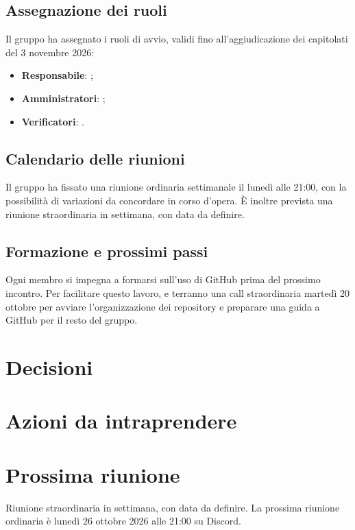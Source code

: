 \documentclass[verbale=interno]{gpt}
\begin{document}
\subsection{Assegnazione dei ruoli}
Il gruppo ha assegnato i ruoli di avvio, validi fino all'aggiudicazione
dei capitolati del 3 novembre 2026:
\begin{itemize}
  \item \textbf{Responsabile}: ;
  \item \textbf{Amministratori}: ;
  \item \textbf{Verificatori}: .
\end{itemize}

\subsection{Calendario delle riunioni}
Il gruppo ha fissato una riunione ordinaria settimanale il lunedì alle
21:00, con la possibilità di variazioni da concordare in corso d'opera.
È inoltre prevista una riunione straordinaria in settimana, con data da
definire.

\subsection{Formazione e prossimi passi}
Ogni membro si impegna a formarsi sull'uso di GitHub prima del prossimo
incontro. Per facilitare questo lavoro,  e
 terranno una call straordinaria martedì 20 ottobre per
avviare l'organizzazione dei repository e preparare una guida a GitHub
per il resto del gruppo.

\section{Decisioni}
\begin{decisioni}
\end{decisioni}

\section{Azioni da intraprendere}
\begin{azioni}
\end{azioni}

\section{Prossima riunione}
Riunione straordinaria in settimana, con data da definire. La prossima
riunione ordinaria è lunedì 26 ottobre 2026 alle 21:00 su Discord.
\end{document}
